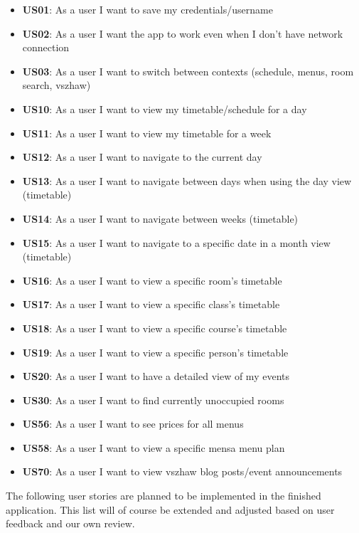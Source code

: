 \begin{markdown}
\begin{itemize}
  \item \textbf{US01}: As a user I want to save my credentials/username
  \item \textbf{US02}: As a user I want the app to work even when I don't have network connection
  \item \textbf{US03}: As a user I want to switch between contexts (schedule, menus, room search, vszhaw)
  \item \textbf{US10}: As a user I want to view my timetable/schedule for a day
  \item \textbf{US11}: As a user I want to view my timetable for a week
  \item \textbf{US12}: As a user I want to navigate to the current day
  \item \textbf{US13}: As a user I want to navigate between days when using the day view (timetable)
  \item \textbf{US14}: As a user I want to navigate between weeks (timetable)
  \item \textbf{US15}: As a user I want to navigate to a specific date in a month view (timetable)
  \item \textbf{US16}: As a user I want to view a specific room's timetable
  \item \textbf{US17}: As a user I want to view a specific class's timetable
  \item \textbf{US18}: As a user I want to view a specific course's timetable
  \item \textbf{US19}: As a user I want to view a specific person's timetable
  \item \textbf{US20}: As a user I want to have a detailed view of my events
  \item \textbf{US30}: As a user I want to find currently unoccupied rooms
  \item \textbf{US56}: As a user I want to see prices for all menus
  \item \textbf{US58}: As a user I want to view a specific mensa menu plan
  \item \textbf{US70}: As a user I want to view vszhaw blog posts/event announcements
\end{itemize}

\newpage

The following user stories are planned to be implemented in the finished application. This list will of course be extended and adjusted based on user feedback and our own review.


\end{markdown}
